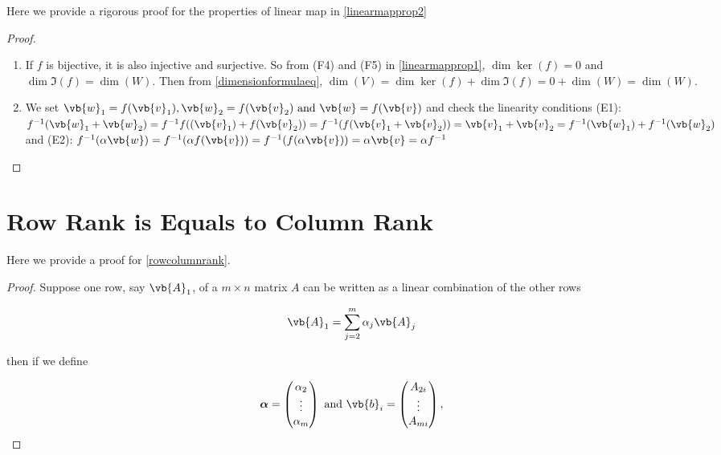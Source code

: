 \documentclass[a4paper,12pt]{report}
\begin{document}
\begin{appendices}
Here we provide a rigorous proof for the properties of linear map in \cref{linearmapprop2}

\begin{proof}
    \begin{enumerate}[label=(\(G\)\arabic*)]
        \item If \(f\)  is bijective, it is also injective and surjective. So from (F4) and (F5) in \cref{linearmapprop1}, \(\dim \ker (f) = 0\) and \(\dim \Im (f) = \dim (W)\). Then from \cref{dimensionformulaeq}, \(\dim (V) = \dim \ker (f) + \dim \Im (f) = 0 + \dim (W) = \dim (W)\).
        \item We set \(\vb{w} _{1} = f(\vb{v} _{1} ), \vb{w} _{2}  = f(\vb{v} _{2} ) \text { and } \vb{w} = f(\vb{v} )\) and check the linearity conditions (E1): \(f^{-1} (\vb{w} _{1} +\vb{w} _{2} ) = f^{-1} f((\vb{v} _{1}) + f(\vb{v} _{2} )) = f^{-1} (f(\vb{v} _{1} + \vb{v} _{2} )) = \vb{v} _{1} + \vb{v} _{2}  = f^{-1} (\vb{w} _{1}  ) + f^{-1} (\vb{w} _{2} )\) and (E2): \(f^{-1} (\alpha \vb{w} ) = f^{-1} (\alpha f(\vb{v} )) = f^{-1} (f(\alpha \vb{v} )) = \alpha \vb{v} = \alpha f^{-1}\)
    \end{enumerate}
\end{proof}
    
\section{Row Rank is Equals to Column Rank} \label{rowcolumnrankapp}

Here we provide a proof for \cref{rowcolumnrank}.

\begin{proof}
    Suppose one row, say \(\vb{A} _{1} \), of a \(m\times n\) matrix \(A\) can be written as a linear combination of the other rows

    \begin{equation}
        \vb{A} _{1} = \sum_{j=2}^{m} \alpha _{j} \vb{A} _{j} 
    \end{equation}

    then if we define 

    \begin{equation}
        \boldsymbol{\alpha } = \begin{pmatrix}
             \alpha _{2}  \\
             \vdots  \\
             \alpha _{m}  \\
        \end{pmatrix} \text { and } \vb{b} _{i} = \begin{pmatrix}
             A_{2i}   \\
             \vdots   \\
             A_{m i}  \\
        \end{pmatrix} ,
    \end{equation}
        

\end{proof}
\end{appendices}
\end{document}
